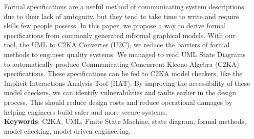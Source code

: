 





\abstract
Formal specifications are a useful method of communicating system descriptions due to their lack of ambiguity,
but they tend to take time to write and require skills few people possess.
In this paper, we propose a way to derive formal specifications from commonly generated informal graphical models.
With our tool, the UML to C2KA Converter (U2C),
we reduce the barriers of formal methods to engineer quality systems.
We managed to read UML State Diagrams to automatically produce Communicating Concurrent Kleene Algebra (C2KA) specifications.
These specifications can be fed to C2KA model checkers, like the Implicit Interactions Analysis Tool (IIAT).
By improving the accessibility of these model checkers, we can identify vulnerabilities and faults earlier in the design process.
This should reduce design costs and reduce operational damages by helping engineers build safer and more secure systems.
\\
\textbf{Keywords}: C2KA, UML, Finite State Machine, state diagram, formal methods, model checking, model driven engineering.
